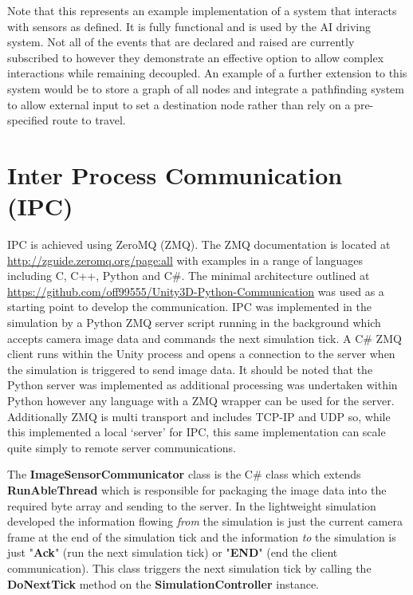 \documentclass{article}
\begin{document}
Note that this represents an example implementation of a system that interacts with sensors as defined. It is fully functional and is used by the AI driving system. Not all of the events that are declared and raised are currently subscribed to however they demonstrate an effective option to allow complex interactions while remaining decoupled. An example of a further extension to this system would be to store a graph of all nodes and integrate a pathfinding system to allow external input to set a destination node rather than rely on a pre-specified route to travel.

\section{Inter Process Communication (IPC)}\label{s:ipc}

IPC is achieved using ZeroMQ (ZMQ). The ZMQ documentation is located at \url{http://zguide.zeromq.org/page:all} with examples in a range of languages including C, C++, Python and C\#. The minimal architecture outlined at \url{https://github.com/off99555/Unity3D-Python-Communication} was used as a starting point to develop the communication. IPC was implemented in the simulation by a Python ZMQ server script running in the background which accepts camera image data and commands the next simulation tick. A C\# ZMQ client runs within the Unity process and opens a connection to the server when the simulation is triggered to send image data. It should be noted that the Python server was implemented as additional processing was undertaken within Python however any language with a ZMQ wrapper can be used for the server. Additionally ZMQ is multi transport and includes TCP-IP and UDP so, while this implemented a local `server' for IPC, this same implementation can scale quite simply to remote server communications. 

The \textbf{ImageSensorCommunicator} class is the C\# class which extends \textbf{RunAbleThread} which is responsible for packaging the image data into the required byte array and sending to the server. In the lightweight simulation developed the information flowing \textit{from} the simulation is just the current camera frame at the end of the simulation tick and the information \textit{to} the simulation is just "\textbf{Ack}" (run the next simulation tick) or "\textbf{END}" (end the client communication). This class triggers the next simulation tick by calling the \textbf{DoNextTick} method on the \textbf{SimulationController} instance.
\end{document}
